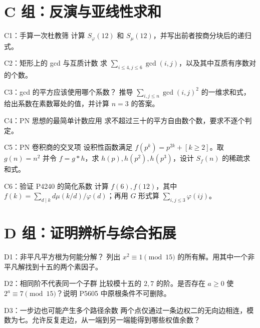 \documentclass[UTF8,a4paper,11pt,oneside,openany,fontset=fandol]{ctexbook}
\theoremstyle{definition}
\begin{document}
\section{C 组：反演与亚线性求和}
\begin{problem}{C1：手算一次杜教筛}
计算 $S_\varphi(12)$ 和 $S_\mu(12)$，并写出前者按商分块后的递归式。
\end{problem}


\begin{problem}{C2：矩形上的 gcd 与互质计数}
求 $\sum_{i\le4,j\le6}\gcd(i,j)$，以及其中互质有序数对的个数。
\end{problem}


\begin{problem}{C3：gcd 的平方应该使用哪个系数？}
推导 $\sum_{i,j\le n}\gcd(i,j)^2$ 的一维求和式，给出系数在素数幂处的值，并计算 $n=3$ 的答案。
\end{problem}


\begin{problem}{C4：PN 思想的最简单计数应用}
求不超过三十的平方自由数个数，要求不逐个判定。
\end{problem}


\begin{problem}{C5：PN 卷积商的交叉项}
设积性函数满足 $f(p^k)=p^{2k}+[k\ge2]$。取 $g(n)=n^2$ 并令 $f=g*h$，求 $h(p),h(p^2),h(p^3)$，设计 $S_f(n)$ 的稀疏求和式。
\end{problem}


\begin{problem}{C6：验证 P4240 的简化系数}
计算 $f(6),f(12)$，其中 $f(k)=\sum_{d\mid k}d\mu(k/d)/\varphi(d)$；再用 $G$ 形式算 $\sum_{i,j\le3}\varphi(ij)$。
\end{problem}


\section{D 组：证明辨析与综合拓展}
\begin{problem}{D1：非平凡平方根为何能分解？}
列出 $x^2\equiv1\pmod{15}$ 的所有解。用其中一个非平凡解找到十五的两个素因子。
\end{problem}


\begin{problem}{D2：相同阶不代表同一个子群}
比较模十五的 $2,7$ 的阶。是否存在 $a\ge0$ 使 $2^a\equiv7\pmod{15}$？说明 P5605 中原根条件不可删除。
\end{problem}


\begin{problem}{D3：一步边也可能产生多个路径余数}
两个点仅通过一条边权二的无向边相连，模数为七。允许反复走边，从一端到另一端能得到哪些权值余数？
\end{problem}
\end{document}
